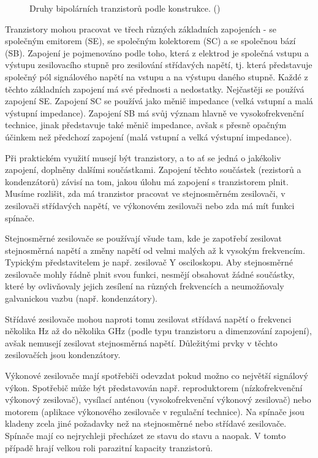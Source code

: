     \begin{figure*}
      \centering
      \caption{Druhy bipolárních tranzistorů podle konstrukce. (\cite[s.~115]{Frohn2006})}
      \label{teo:fig073}
    \end{figure*}

    Tranzistory mohou pracovat ve třech různých základních zapojeních - se společným emitorem
    (\textsc{SE}), se společným kolektorem (\textsc{SC}) a se společnou bází (\textsc{SB}). Zapojení
    je pojmenováno podle toho, která z elektrod je společná vstupu a výstupu zesilovacího stupně pro
    zesilování střídavých napětí, tj. která představuje společný pól signálového napětí na vstupu a
    na výstupu daného stupně. Každé z těchto základních zapojení má své přednosti a nedostatky.
    Nejčastěji se používá zapojení \textsc{SE}. Zapojení \textsc{SC} se používá jako měnič impedance
    (velká vstupní a malá výstupní impedance). Zapojení \textsc{SB} má svůj význam hlavně ve
    vysokofrekvenční technice, jinak představuje také měnič impedance, avšak s přesně opačným
    účinkem než předchozí zapojení (malá vstupní a velká výstupní impedance).

    Při praktickém využití musejí být tranzistory, a to ať se jedná o jakékoliv zapojení, doplněny
    dalšími součástkami. Zapojení těchto součástek (rezistorů a kondenzátorů) závisí na tom, jakou
    úlohu má zapojení s tranzistorem plnit. Musíme rozlišit, zda má tranzistor pracovat ve
    stejnosměrném zesilovači, v zesilovači střídavých napětí, ve výkonovém zesilovači nebo zda má
    mít funkci spínače.

    Stejnosměrné zesilovače se používají všude tam, kde je zapotřebí zesilovat stejnosměrná napětí a
    změny napětí od velmi malých až k vysokým frekvencím. Typickým představitelem je např. zesilovač
    Y osciloskopu. Aby stejnosměrné zesilovače mohly řádně plnit svou funkci, nesmějí obsahovat
    žádné součástky, které by ovlivňovaly jejich zesílení na různých frekvencích a neumožňovaly
    galvanickou vazbu (např. kondenzátory).

    Střídavé zesilovače mohou naproti tomu zesilovat střídavá napětí o frekvenci několika \si{\Hz}
    až do několika \si{\GHz} (podle typu tranzistoru a dimenzování zapojení), avšak nemusejí
    zesilovat stejnosměrná napětí. Důležitými prvky v těchto zesilovačích jsou kondenzátory.

    Výkonové zesilovače mají spotřebiči odevzdat pokud možno co největší signálový výkon. Spotřebič
    může být představován např. reproduktorem (nízkofrekvenční výkonový zesilovač), vysílací anténou
    (vysokofrekvenční výkonový zesilovač) nebo motorem (aplikace výkonového zesilovače v regulační
    technice). Na spínače jsou kladeny zcela jiné požadavky než na stejnosměrné nebo střídavé
    zesilovače. Spínače mají co nejrychleji přecházet ze stavu  do stavu  a
    naopak. V tomto případě hrají velkou roli parazitní kapacity tranzistorů.


